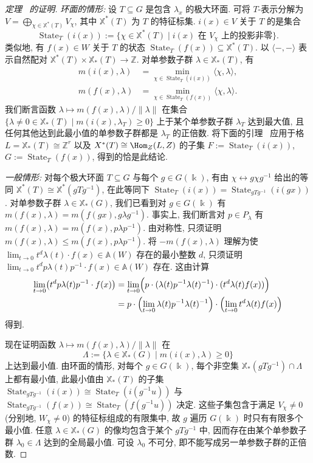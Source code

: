 \begin{proof}[定理~ 的证明]
\textit{环面的情形:} 设 $T\subseteq G$ 是包含 $\lambda_x$ 的极大环面. 可将 $T$-表示分解为 $V=\bigoplus_{\chi\in\mathbb X^*(T)}V_\chi$, 其中 $\mathbb X^*(T)$ 为 $T$ 的特征标集. $i(x)\in V$ 关于 $T$ 的是集合
\[
\operatorname{State}_T(i(x)):=\{\chi\in\mathbb X^*(T)\mid i(x)\text{ 在 }V_\chi\text{ 上的投影非零}\}.
\]
类似地, 有 $f(x)\in W$ 关于 $T$ 的状态 $\operatorname{State}_T(f(x))\subseteq\mathbb X^*(T)$. 以 $\langle-,-\rangle$ 表示自然配对 $\mathbb X^*(T)\times\mathbb X_*(T)\to\mathbb Z$. 对单参数子群 $\lambda\in\mathbb X_*(T)$, 有
\begin{align*}
m(i(x),\lambda)&=\min_{\chi\in\operatorname{State}_T(i(x))}\langle\chi,\lambda\rangle,\\
m(f(x),\lambda)&=\min_{\chi\in\operatorname{State}_T(f(x))}\langle\chi,\lambda\rangle.
\end{align*}
我们断言函数 $\lambda\mapsto m(f(x),\lambda)/\|\lambda\|$ 在集合 $\{\lambda\ne0\in\mathbb X_*(T)\mid m(i(x),\lambda_T)\geq0\}$ 上于某个单参数子群 $\lambda_T$ 达到最大值, 且任何其他达到此最小值的单参数子群都是 $\lambda_T$ 的正倍数. 将下面的引理~ 应用于格 $L=\mathbb X_*(T)\cong\mathbb Z^r$ 以及 $\mathbb X^*(T)\cong\Hom_{\mathbb Z}(L,\mathbb Z)$ 的子集 $F:=\operatorname{State}_T(i(x))$, $G:=\operatorname{State}_T(f(x))$, 得到的恰是此结论.

\textit{一般情形:} 对每个极大环面 $T\subseteq G$ 与每个 $g\in G(\Bbbk)$, 有由 $\chi\leftrightarrow g\chi g^{-1}$ 给出的等同 $\mathbb X^*(T)\cong\mathbb X^*(gTg^{-1})$, 在此等同下 $\operatorname{State}_T(i(x))=\operatorname{State}_{gTg^{-1}}(i(gx))$. 对单参数子群 $\lambda\in\mathbb X_*(G)$, 我们已看到对 $g\in G(\Bbbk)$ 有 $m(f(x),\lambda)=m(f(gx),g\lambda g^{-1})$. 事实上, 我们断言对 $p\in P_\lambda$ 有 $m(f(x),\lambda)=m(f(x),p\lambda p^{-1})$. 由对称性, 只须证明 $m(f(x),\lambda)\leq m(f(x),p\lambda p^{-1})$. 将 $-m(f(x),\lambda)$ 理解为使 $\lim_{t\to0}t^d\lambda(t)\cdot f(x)\in\mathbb A(W)$ 存在的最小整数 $d$, 只须证明 $\lim_{t\to0}t^dp\lambda(t)p^{-1}\cdot f(x)\in\mathbb A(W)$ 存在. 这由计算
\begin{align*}
\lim_{t\to0}\bigl(t^dp\lambda(t)p^{-1}\cdot f(x)\bigr)
&=\lim_{t\to0}\Bigl(p\cdot(\lambda(t)p^{-1}\lambda(t)^{-1})\cdot(t^d\lambda(t)f(x))\Bigr)\\
&=p\cdot\Bigl(\lim_{t\to0}\lambda(t)p^{-1}\lambda(t)^{-1}\Bigr)\cdot\Bigl(\lim_{t\to0}t^d\lambda(t)f(x)\Bigr)
\end{align*}
得到.

现在证明函数 $\lambda\mapsto m(f(x),\lambda)/\|\lambda\|$ 在
\[
\Lambda:=\{\lambda\in\mathbb X_*(G)\mid m(i(x),\lambda)\geq0\}
\]
上达到最小值. 由环面的情形, 对每个 $g\in G(\Bbbk)$, 每个非空集 $\mathbb X_*(gTg^{-1})\cap\Lambda$ 上都有最小值, 此最小值由 $\mathbb X_*(T)$ 的子集 $\operatorname{State}_{gTg^{-1}}(i(x))\cong\operatorname{State}_T(i(g^{-1}u))$ 与 $\operatorname{State}_{gTg^{-1}}(f(x))\cong\operatorname{State}_T(f(g^{-1}u))$ 决定. 这些子集包含于满足 $V_\chi\ne0$ (分别地, $W_\chi\ne0$) 的特征标组成的有限集中, 故 $g$ 遍历 $G(\Bbbk)$ 时只有有限多个最小值. 任意 $\lambda\in\mathbb X_*(G)$ 的像均包含于某个 $gTg^{-1}$ 中, 因而存在由某个单参数子群 $\lambda_0\in\Lambda$ 达到的全局最小值. 可设 $\lambda_0$ 不可分, 即不能写成另一单参数子群的正倍数.


\end{proof}
